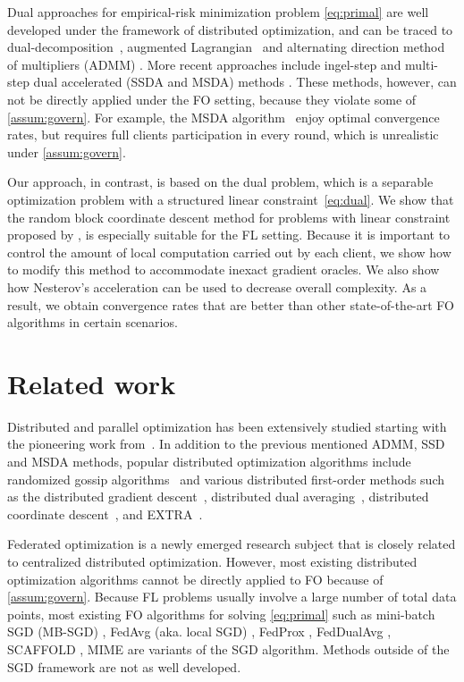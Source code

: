 Dual approaches for empirical-risk minimization problem \eqref{eq:primal} are well developed under the framework of distributed optimization, and can be traced to dual-decomposition~\citep{zeng2008fast,joachims1999making}, augmented Lagrangian~ \citep{jakovetic2014linear} and alternating direction method of multipliers (ADMM) \citep{boyd2011distributed,wei2012distributed}. More recent approaches include ingel-step and multi-step dual accelerated (SSDA and MSDA) methods \citep{Scaman2017OptimalAF}. These methods, however, can not be directly applied under the FO setting, because they violate some of \autoref{assum:govern}. For example, the MSDA algorithm~\citep{Scaman2017OptimalAF} enjoy optimal convergence rates, but requires full clients participation in every round, which is unrealistic under \autoref{assum:govern}. 

Our approach, in contrast, is based on the dual problem, which is a separable optimization problem with a structured linear constraint~\eqref{eq:dual}. We show that the random block coordinate descent method for problems with linear constraint proposed by \citet{necoara2017random}, is especially suitable for the FL setting. Because it is important to control the amount of local computation carried out by each client, we show how to modify this method to accommodate inexact gradient oracles. We also show how Nesterov's acceleration can be used to decrease overall complexity. As a result, we obtain convergence rates that are better than other state-of-the-art FO algorithms in certain scenarios. 

\section{Related work}
\label{sec:relatedWork}

Distributed and parallel optimization has been extensively studied starting with the pioneering work from~\citet{Bertsekas89}. In addition to the previous mentioned ADMM, SSD and MSDA methods, popular distributed optimization algorithms include randomized gossip algorithms~\citep{BoydGPS06} and various distributed first-order methods such as the distributed gradient descent~\citep{NedicO09}, distributed dual averaging~\citep{DuchiAW12}, distributed coordinate descent~\citep{RichtarikT16}, and EXTRA~\citep{ShiLWY15}.

Federated optimization \citep{wang2021field} is a newly emerged research subject that is closely related to centralized distributed optimization. However, most existing distributed optimization algorithms cannot be directly applied to FO because of \autoref{assum:govern}. Because FL problems usually involve a large number of total data points, most existing FO algorithms for solving \eqref{eq:primal} such as mini-batch SGD (MB-SGD) \citep{WoodworthPS20}, FedAvg (aka. local SGD) \citep{McMahan17}, FedProx \citep{li2018federated}, FedDualAvg \citep{yuan2021federated},  SCAFFOLD \citep{pmlr-v119-karimireddy20a}, MIME \citep{karimireddy2020mime} are variants of the SGD algorithm. Methods outside of the SGD framework are not as well developed. 

